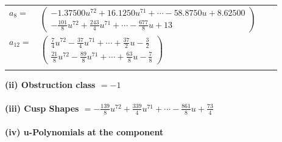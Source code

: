 \documentclass[1p]{elsarticle_modified}
\theoremstyle{definition}
\begin{document}
\begin{tabular}{m{7pt} m{180pt} m{7pt} m{180pt} }
\flushright $a_{8}=$&$\begin{pmatrix}-1.37500 u^{72}+16.1250 u^{71}+\cdots-58.8750 u+8.62500\\-\frac{101}{8} u^{72}+\frac{243}{4} u^{71}+\cdots-\frac{677}{8} u+13\end{pmatrix}$ \\
\flushright $a_{12}=$&$\begin{pmatrix}\frac{7}{4} u^{72}-\frac{37}{4} u^{71}+\cdots+\frac{37}{2} u-\frac{3}{2}\\\frac{21}{8} u^{72}-\frac{89}{8} u^{71}+\cdots+\frac{63}{8} u-\frac{7}{8}\end{pmatrix}$\\&\end{tabular}
\flushleft \textbf{(ii) Obstruction class $= -1$}\\~\\
\flushleft \textbf{(iii) Cusp Shapes $= -\frac{139}{8} u^{72}+\frac{339}{4} u^{71}+\cdots-\frac{861}{8} u+\frac{73}{4}$}\\~\\
\newpage\renewcommand{\arraystretch}{1}
\flushleft \textbf{(iv) u-Polynomials at the component}\newline \\
\end{document}
